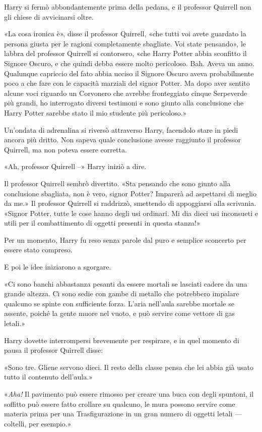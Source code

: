 Harry si fermò abbondantemente prima della pedana, e il professor Quirrell non gli chiese di avvicinarsi oltre.

«La cosa ironica è», disse il professor Quirrell, «che tutti voi avete guardato la persona giusta per le ragioni completamente sbagliate. Voi state pensando», le labbra del professor Quirrell si contorsero, «che Harry Potter abbia sconfitto il Signore Oscuro, e che quindi debba essere molto pericoloso. Bah. Aveva un anno. Qualunque capriccio del fato abbia ucciso il Signore Oscuro aveva probabilmente poco a che fare con le capacità marziali del signor Potter. Ma dopo aver sentito alcune voci riguardo un Corvonero che avrebbe fronteggiato cinque Serpeverde più grandi, ho interrogato diversi testimoni e sono giunto alla conclusione che Harry Potter sarebbe stato il mio studente più pericoloso.»

Un’ondata di adrenalina si riversò attraverso Harry, facendolo stare in piedi ancora più dritto. Non sapeva quale conclusione avesse raggiunto il professor Quirrell, ma non poteva essere corretta.

«Ah, professor Quirrell –» Harry iniziò a dire.

Il professor Quirrell sembrò divertito. «Sta pensando che sono giunto alla conclusione sbagliata, non è vero, signor Potter? Imparerà ad aspettarsi di meglio da me.» Il professor Quirrell si raddrizzò, smettendo di appoggiarsi alla scrivania. «Signor Potter, tutte le cose hanno degli usi ordinari. Mi dia dieci usi inconsueti e utili per il combattimento di oggetti presenti in questa stanza!»

Per un momento, Harry fu reso senza parole dal puro e semplice sconcerto per essere stato compreso.

E poi le idee iniziarono a sgorgare.

«Ci sono banchi abbastanza pesanti da essere mortali se lasciati cadere da una grande altezza. Ci sono sedie con gambe di metallo che potrebbero impalare qualcuno se spinte con sufficiente forza. L’aria nell’aula sarebbe mortale se assente, poiché la gente muore nel vuoto, e può servire come vettore di gas letali.»

Harry dovette interrompersi brevemente per respirare, e in quel momento di pausa il professor Quirrell disse:

«Sono tre. Gliene servono dieci. Il resto della classe pensa che lei abbia già usato tutto il contenuto dell’aula.»

«\textit{Aha!} Il pavimento può essere rimosso per creare una buca con degli spuntoni, il soffitto può essere fatto crollare su qualcuno, le mura possono servire come materia prima per una Trasfigurazione in un gran numero di oggetti letali — coltelli, per esempio.»

